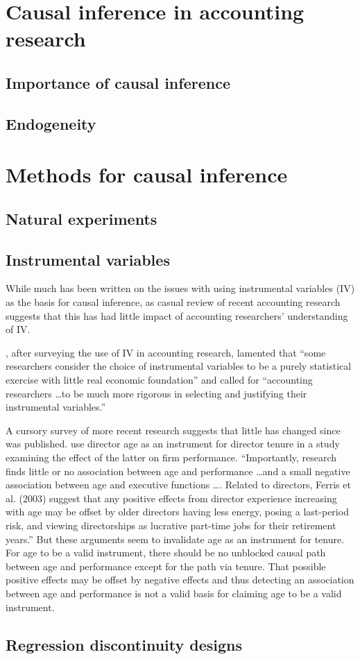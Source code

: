 \section{Causal inference in accounting research}

\subsection{Importance of causal inference}

\subsection{Endogeneity}


\section{Methods for causal inference}

\subsection{Natural experiments}

\subsection{Instrumental variables}
While much has been written on the issues with using instrumental variables (IV) as the basis for causal inference, as casual review of recent accounting research suggests that this has had little impact of accounting researchers' understanding of IV.

\citet{Larcker:2010fq}, after surveying the use of IV in accounting research, lamented that ``some researchers consider the choice of instrumental variables to be a purely statistical exercise with little real economic foundation'' and called for 
``accounting researchers \dots to be much more rigorous in selecting and justifying their instrumental variables.''

A cursory survey of more recent research suggests that little has changed since \citet{Larcker:2010fq} was published. \citet{Kim:2014fm} use director age as an instrument for director tenure in a study examining the effect of the latter on firm performance. 
``Importantly, research finds little or no association between age and performance \dots and a small negative association between age and executive functions \dots. 
Related to directors, Ferris et al. (2003) suggest that any positive effects from director experience increasing with age may be offset by older directors having less energy, posing a last-period risk, and viewing directorships as lucrative part-time jobs for their retirement years.'' 
But these arguments seem to invalidate age as an instrument for tenure. 
For age to be a valid instrument, there should be no unblocked causal path between age and performance except for the path via tenure.
 That possible positive effects may be offset by negative effects and thus detecting an association between age and performance is not a valid basis for claiming age to be a valid instrument.

\subsection{Regression discontinuity designs}